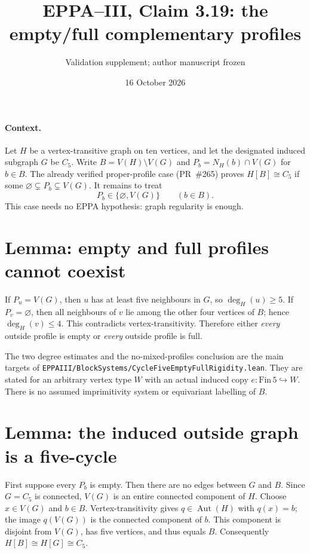 \documentclass[11pt,a4paper]{article}
\title{EPPA--III, Claim 3.19: the empty/full complementary profiles}
\author{Validation supplement; author manuscript frozen}
\date{16 October 2026}
\begin{document}
\maketitle

\paragraph{Context.}
Let \(H\) be a vertex-transitive graph on ten vertices,
and let the designated induced subgraph \(G\) be \(C_5\).
Write \(B=V(H)\setminus V(G)\) and
\(P_b=N_H(b)\cap V(G)\) for \(b\in B\).
The already verified proper-profile case (PR~\#265)
proves \(H[B]\cong C_5\) if some
\(\varnothing\subsetneq P_b\subsetneq V(G)\).
It remains to treat
\[
       P_b\in\{\varnothing,V(G)\}\qquad(b\in B).
\]
This case needs no EPPA hypothesis: graph regularity is enough.

\section*{Lemma: empty and full profiles cannot coexist}
If \(P_u=V(G)\), then \(u\) has at least five neighbours
in \(G\), so \(\deg_H(u)\ge5\).
If \(P_v=\varnothing\), then all neighbours of \(v\)
lie among the other four vertices of \(B\); hence
\(\deg_H(v)\le4\). This contradicts vertex-transitivity.
Therefore either \emph{every} outside profile is empty
or \emph{every} outside profile is full.

The two degree estimates and the no-mixed-profiles
conclusion are the main targets of
\texttt{EPPAIII/BlockSystems/CycleFiveEmptyFullRigidity.lean}.
They are stated for an arbitrary vertex type \(W\)
with an actual induced copy \(e:\mathrm{Fin}\,5\hookrightarrow W\).
There is no assumed imprimitivity system or
equivariant labelling of \(B\).

\section*{Lemma: the induced outside graph is a five-cycle}
First suppose every \(P_b\) is empty.
Then there are no edges between \(G\) and \(B\).
Since \(G=C_5\) is connected, \(V(G)\) is an entire
connected component of \(H\).
Choose \(x\in V(G)\) and \(b\in B\).
Vertex-transitivity gives \(q\in\operatorname{Aut}(H)\)
with \(q(x)=b\); the image \(q(V(G))\) is the connected
component of \(b\). This component is disjoint from
\(V(G)\), has five vertices, and thus equals \(B\).
Consequently \(H[B]\cong H[G]\cong C_5\).
\end{document}
